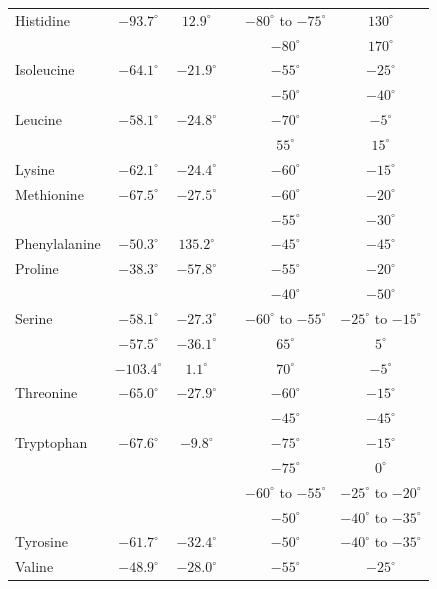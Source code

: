 \documentclass[12pt]{article}
\begin{document}
\begin{center}
\begin{tabular}{lccccc}
Histidine        & $-93.7^{\circ}$ & $12.9^{\circ}$ & & $-80^{\circ}$ to $-75^{\circ}$ & $130^{\circ}$  \\
		 &	 &	&  & $-80^{\circ}$ & $170^{\circ}$ \\
Isoleucine     & $-64.1^{\circ}$ & $-21.9^{\circ}$ & & $-55^{\circ}$ & $-25^{\circ}$ \\
		&	&	& & $-50^{\circ}$ & $-40^{\circ}$ \\
Leucine         & $-58.1^{\circ}$ & $-24.8^{\circ}$ & & $-70^{\circ}$ & $-5^{\circ}$  \\
 		&  & & & $55^{\circ}$ & $15^{\circ}$  \\
Lysine           & $-62.1^{\circ}$ & $-24.4^{\circ}$ & & $-60^{\circ}$ & $-15^{\circ}$ \\
Methionine   & $-67.5^{\circ}$ & $-27.5^{\circ}$ & & $-60^{\circ}$ & $-20^{\circ}$  \\
		&	&	& & $-55^{\circ}$ & $-30^{\circ}$ \\
Phenylalanine  & $-50.3^{\circ}$ & $135.2^{\circ}$ & & $-45^{\circ}$ & $-45^{\circ}$  \\
Proline &  $-38.3^{\circ}$ & $-57.8^{\circ}$ & & $-55^{\circ}$ & $-20^{\circ}$  \\
		&   &  & & $-40^{\circ}$ & $-50^{\circ}$  \\
Serine          & $-58.1^{\circ}$ & $-27.3^{\circ}$ & & $-60^{\circ}$ to $-55^{\circ}$ & $-25^{\circ}$ to $-15^{\circ}$  \\
		& $-57.5^{\circ}$ & $-36.1^{\circ}$ & & $65^{\circ}$ & $5^{\circ}$  \\
		& $-103.4^{\circ}$ & $1.1^{\circ}$ &  & $70^{\circ}$ & $-5^{\circ}$   \\
Threonine          & $-65.0^{\circ}$ & $-27.9^{\circ}$ & & $-60^{\circ}$ & $-15^{\circ}$  \\
		&	&	& & $-45^{\circ}$ & $-45^{\circ}$ \\
Tryptophan          & $-67.6^{\circ}$& $-9.8^{\circ}$ & & $-75^{\circ}$ & $-15^{\circ}$  \\
		&  &  & & $-75^{\circ}$ & $0^{\circ}$  \\
		&  &  & & $-60^{\circ}$ to $-55^{\circ}$ & $-25^{\circ}$ to $-20^{\circ}$ \\
		&  &  & & $-50^{\circ}$ & $-40^{\circ}$ to $-35^{\circ}$ \\
Tyrosine          & $-61.7^{\circ}$ & $-32.4^{\circ}$ & & $-50^{\circ}$ & $-40^{\circ}$ to $-35^{\circ}$ \\
Valine          & $-48.9^{\circ}$ & $-28.0^{\circ}$ & & $-55^{\circ}$ & $-25^{\circ}$  \\
\hline
\end{tabular}
\end{center}
\end{document}
